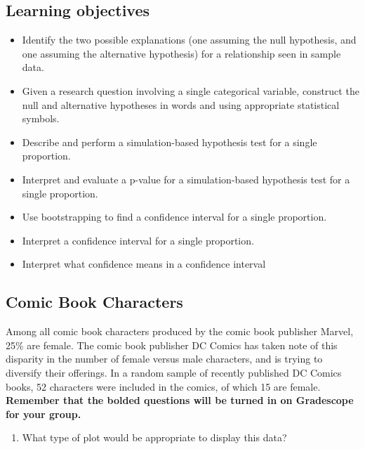 \documentclass[
]{report}
\providecommand{\tightlist}{%
  \setlength{\itemsep}{0pt}\setlength{\parskip}{0pt}}
\begin{document}

\hypertarget{learning-objectives-8}{%
\subsection{Learning objectives}\label{learning-objectives-8}}

\begin{itemize}
\item
  Identify the two possible explanations (one assuming the null hypothesis, and one assuming the alternative hypothesis) for a relationship seen in sample data.
\item
  Given a research question involving a single categorical variable, construct the null and alternative hypotheses in words and using appropriate statistical symbols.
\item
  Describe and perform a simulation-based hypothesis test for a single proportion.
\item
  Interpret and evaluate a p-value for a simulation-based hypothesis test for a single proportion.
\item
  Use bootstrapping to find a confidence interval for a single proportion.
\item
  Interpret a confidence interval for a single proportion.
\item
  Interpret what confidence means in a confidence interval
\end{itemize}

\hypertarget{comic-book-characters}{%
\subsection{Comic Book Characters}\label{comic-book-characters}}

Among all comic book characters produced by the comic book publisher Marvel, 25\% are female. The comic book publisher DC Comics has taken note of this disparity in the number of female versus male characters, and is trying to diversify their offerings. In a random sample of recently published DC Comics books, 52 characters were included in the comics, of which 15 are female. \textbf{Remember that the bolded questions will be turned in on Gradescope for your group.}

\begin{enumerate}
\def\labelenumi{\arabic{enumi}.}
\tightlist
\item
  What type of plot would be appropriate to display this data?
\end{enumerate}
\end{document}
